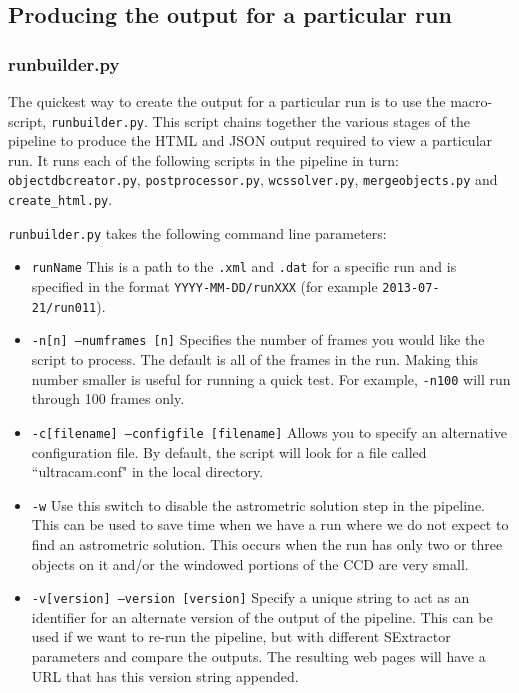 \begin{itemize}
\end{itemize}

\subsection{Producing the output for a particular run}

\subsubsection{runbuilder.py}

The quickest way to create the output for a particular run is to use the macro-script, \texttt{runbuilder.py}. This script chains together the various stages of the pipeline to produce the HTML and JSON output required to view a particular run. It runs each of the following scripts in the pipeline in turn: \texttt{objectdbcreator.py}, \texttt{postprocessor.py}, \texttt{wcssolver.py}, \texttt{mergeobjects.py} and \texttt{create\_html.py}.

\texttt{runbuilder.py} takes the following command line parameters:
\begin{itemize}
  \item \texttt{runName} This is a path to the \texttt{.xml} and \texttt{.dat} for a specific run and is specified in the format \texttt{YYYY-MM-DD/runXXX}  (for example \texttt{2013-07-21/run011}).
  \item \texttt{-n[n] --numframes [n]} Specifies the number of frames you would like the script to process. The default is all of the frames in the run. Making this number smaller is useful for running a quick test. For example, \texttt{-n100} will run through 100 frames only.
  \item \texttt{-c[filename] --configfile [filename]} Allows you to specify an alternative configuration file. By default, the script will look for a file called ``ultracam.conf" in the local directory. 
  \item \texttt{-w} Use this switch to disable the astrometric solution step in the pipeline. This can be used to save time when we have a run where we do not expect to find an astrometric solution. This occurs when the run has only two or three objects on it and/or the windowed portions of the CCD are very small.  
  \item \texttt{-v[version] --version [version]} Specify a unique string to act as an identifier for an alternate version of the output of the pipeline. This can be used if we want to re-run the pipeline, but with different SExtractor parameters and compare the outputs. The resulting web pages will have a URL that has this version string appended.    
\end{itemize}

